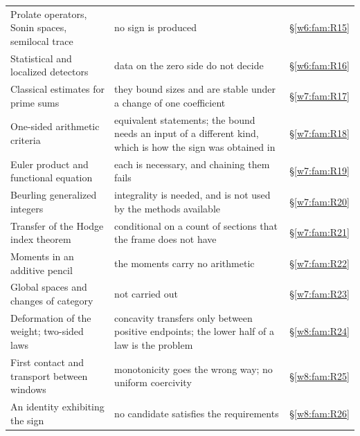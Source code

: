 \documentclass[11pt]{amsart}
\theoremstyle{definition}
\theoremstyle{remark}
\numberwithin{equation}{section}
\begin{document}
{\begin{longtable}{>{\raggedright}p{4.1cm}>{\raggedright}p{7.6cm}>{\raggedright\arraybackslash}p{2.2cm}}
Prolate operators, Sonin spaces, semilocal trace & no sign is produced & \S\ref{w6:fam:R15}\\
Statistical and localized detectors & data on the zero side do not decide & \S\ref{w6:fam:R16}\\
Classical estimates for prime sums & they bound sizes and are stable under a change of one coefficient & \S\ref{w7:fam:R17}\\
One-sided arithmetic criteria & equivalent statements; the bound needs an input of a different kind, which is how the sign was obtained in \cite{P46} & \S\ref{w7:fam:R18}\\
Euler product and functional equation & each is necessary, and chaining them fails & \S\ref{w7:fam:R19}\\
Beurling generalized integers & integrality is needed, and is not used by the methods available & \S\ref{w7:fam:R20}\\
Transfer of the Hodge index theorem & conditional on a count of sections that the frame does not have & \S\ref{w7:fam:R21}\\
Moments in an additive pencil & the moments carry no arithmetic & \S\ref{w7:fam:R22}\\
Global spaces and changes of category & not carried out & \S\ref{w7:fam:R23}\\
Deformation of the weight; two-sided laws & concavity transfers only between positive endpoints; the lower half of a law is the problem & \S\ref{w8:fam:R24}\\
First contact and transport between windows & monotonicity goes the wrong way; no uniform coercivity & \S\ref{w8:fam:R25}\\
An identity exhibiting the sign & no candidate satisfies the requirements & \S\ref{w8:fam:R26}\\
\end{longtable}
}
\end{document}
